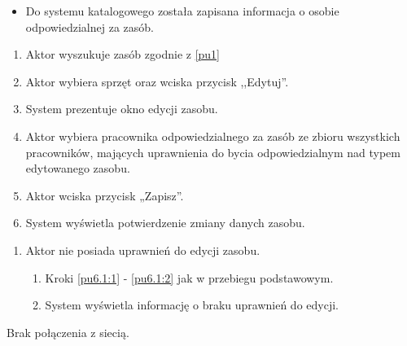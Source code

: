 \begin{itemize}
\item Do systemu katalogowego została zapisana informacja o osobie odpowiedzialnej za zasób.
\end{itemize}

\begin{enumerate}
	\item \label{pu6.1:1} Aktor wyszukuje zasób zgodnie z \ref{pu1}
	\item \label{pu6.1:2} Aktor wybiera sprzęt oraz wciska przycisk ,,Edytuj''.
	\item System prezentuje okno edycji zasobu.
	\item Aktor wybiera pracownika odpowiedzialnego za zasób ze zbioru wszystkich pracowników, mających uprawnienia do bycia odpowiedzialnym nad typem edytowanego zasobu.
	\item Aktor wciska przycisk „Zapisz”.
	\item System wyświetla potwierdzenie zmiany danych zasobu.
\end{enumerate}

\begin{enumerate}
	\item Aktor nie posiada uprawnień do edycji zasobu.
	\begin{enumerate}[label*=\arabic*.]
		\item Kroki \ref{pu6.1:1} - \ref{pu6.1:2} jak w przebiegu podstawowym.
		\item System wyświetla informację o braku uprawnień do edycji.
	\end{enumerate}
\end{enumerate}
Brak połączenia z siecią.

